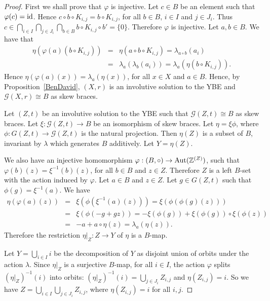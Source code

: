 \begin{proof}
	First we shall prove that $\varphi$ is injective. Let $c\in B$ be an
	element such that $\varphi(c)=\operatorname{id}$. Hence $c\circ b\circ K_{i,j}=b\circ K_{i,j}$, for
	all $b\in B$, $i\in I$ and $j\in J_i$. Thus $c\in \bigcap_{i\in
		I}\bigcap_{j\in J_i}\bigcap_{b\in B} b\circ K_{i,j}\circ b'=\{ 0\}$.
	Therefore $\varphi$ is injective. Let $a,b\in B$. We have that
	\begin{eqnarray*}\eta(\varphi(a)(b\circ K_{i,j}))&=&\eta(a\circ b\circ K_{i,j})=\lambda_{a\circ b}(a_i)\\
		&=&\lambda_{a}(\lambda_{b}(a_i))=\lambda_{a}(\eta(b\circ K_{i,j})).
	\end{eqnarray*}
	Hence $\eta(\varphi(a)(x))=\lambda_a(\eta(x))$, for all $x\in X$ and $a\in B$.
	Hence, by Proposition~\ref{BenDavid}, $(X,r)$ is an involutive solution to the
	YBE and $\mathcal{G}(X,r)\cong B$ as skew braces.
	
	
	Let $(Z,t)$ be an involutive solution to the YBE such that
	$\mathcal{G}(Z,t)\cong B$ as skew braces. Let $\xi\colon
	\mathcal{G}(Z,t)\to  B$ be an isomorphism of skew braces.
	Let $\eta=\xi\phi$, where $\phi\colon G(Z,t)\to
	\mathcal{G}(Z,t)$ is the natural projection. Then $\eta(Z)$ is a
	subset of $B$, invariant by $\lambda$ which generates $B$
	additively. Let $Y=\eta(Z)$.
	
	We also have an injective homomorphism $\varphi:
	(B,\circ)\to \operatorname{Aut}(\mathbb{Z}^{(Z)})$, such that
	$\varphi(b)(z)=\xi^{-1}(b)(z)$, for all $b\in B$ and $z\in Z$.
	Therefore $Z$ is a left $B$-set with the action induced by $\varphi$.
	Let $a\in B$ and $z\in Z$. Let $g\in G(Z,t)$  such that
	$\phi(g)=\xi^{-1}(a)$. We have
	\begin{eqnarray*}
		\eta(\varphi(a)(z))&=&\xi(\phi(\xi^{-1}(a)(z)))=\xi(\phi(\phi(g)(z)))\\
		&=&\xi(\phi(-g+gz))=-\xi(\phi(g))+\xi(\phi(g))\circ\xi(\phi(z))\\
		&=&-a+a\circ \eta(z)=\lambda_a(\eta(z)).
	\end{eqnarray*}
	Therefore the restriction $\eta|_Z\colon Z\longrightarrow Y$ of
	$\eta$ is a $B$-map.
	
	Let $Y=\bigcup_{i\in I} i$ be the decomposition of $Y$
	as disjoint union of orbits under the action $\lambda$. Since
	$\eta|_Z$ is a surjective $B$-map, for all $i\in I$, the action
	$\varphi$ splits $(\eta|_Z)^{-1}(i)$ into orbits:
	$(\eta|_Z)^{-1}(i)=\bigcup_{j\in J_i} Z_{i,j}$ and
	$\eta(Z_{i,j})=i$. So we have $Z=\bigcup_{i\in I}\bigcup_{j\in J_i}
	Z_{i,j}$, where $\eta(Z_{i,j})=i$ for all $i,j$.
	

\end{proof}
